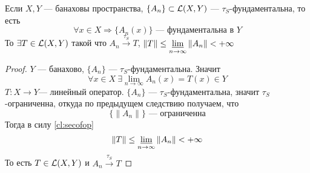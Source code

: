 \begin{next2}
	Если $X,Y$ --- банаховы пространства, $\{A_n\} \subset \mathcal{L}(X,Y)$ --- $\tau_S$-фундаментальна, то есть 
	$$
	\forall x \in X \Rightarrow \{A_n(x)\} \text{ --- фундаментальна в $Y$}
	$$
	То $\exists T \in \mathcal{L}(X,Y)$ такой что $A_n \xrightarrow{\tau_S}T$, $\|T\| \leq \varliminf\limits_{n \to \infty}\|A_n\| < + \infty$
\end{next2}
\begin{proof}
	$Y$ --- банахово, $\{A_n\}$ --- $\tau_S$-фундаментальна. Значит 
	$$
	\forall x \in X \ \exists \lim\limits_{n \to \infty} A_n(x) = T(x) \in Y
	$$
	$T\colon X \to Y$--- линейный оператор. $\{A_n\}$ --- $\tau_S$-фундаментальна, значит $\tau_S$-ограниченна, откуда по предыдущем следствию получаем, что 
	$$
	\{\|A_n\|\} \text{ --- ограниченна}
	$$
	Тогда в силу \ref{cl:secofop} 
	$$
	\|T\| \leq \varliminf_{n \to \infty}\|A_n\| < +\infty
	$$
	То есть $T \in \mathcal{L}(X,Y)$ и $A_n \xrightarrow{\tau_S} T$
\end{proof}
